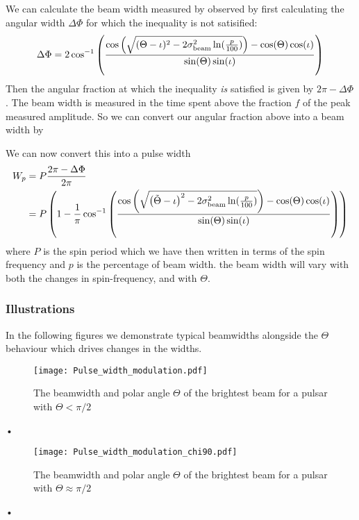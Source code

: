 \documentclass[/home/greg/Thesis/main/main.tex]{subfiles}
\begin{document}
We can calculate the beam width measured by observed by first calculating the
angular width $\Delta\Phi$ for which the inequality is not satisified:
\begin{equation}
    \Delta\Phi = 2\cos^{-1}\left(
                \frac{\cos\left(\sqrt{
                    (\Theta - \iota)^{2}-2\sigma_{\textrm{beam}}^{2} \ln(\frac{p}{100})}\right)-\cos(\Theta)\cos(\iota)}
                          {\sin(\Theta)\sin(\iota)}
                      \right)
\end{equation}
Then the angular fraction at which the inequality \emph{is} satisfied is given by
$2\pi - \Delta\Phi$. The beam width is measured in the time spent above the
fraction $f$ of the peak measured amplitude. So we can convert our angular
fraction above into a beam width by

We can now convert this into a pulse width
\begin{align}
    W_p & = P \frac{2\pi - \Delta\Phi}{2\pi} \\
          & = P\left(1 -
               \frac{1}{\pi}\cos^{-1}\left(
                   \frac{\cos\left(\sqrt{\left(\tilde{\Theta} - \iota\right)^{2}-2\sigma_{\textrm{beam}}^{2} \ln(\frac{p}{100})}\right)
                    - \cos(\Theta)\cos(\iota)}
                          {\sin(\Theta)\sin(\iota)}
                      \right)
                  \right)
\label{eqn: Wp}
\end{align}
where $P$ is the spin period which we have then written in terms of the spin
frequency and $p$ is the percentage of beam width.
the beam width will vary with both the changes in spin-frequency, and with
$\Theta$.

\subsubsection{Illustrations}

In the following figures we demonstrate typical beamwidths alongside the
$\Theta$ behaviour which drives changes in the widths.
\begin{figure}[ht]
\centering
\texttt{[image: Pulse\_width\_modulation.pdf]}
\caption{The beamwidth and polar angle $\Theta$ of the brightest beam for a pulsar
         with $\Theta < \pi/2$}
\label{fig: Pulse width modulation}
\end{figure}•

\begin{figure}[ht]
\centering
\texttt{[image: Pulse\_width\_modulation\_chi90.pdf]}
\caption{The beamwidth and polar angle $\Theta$ of the brightest beam for a pulsar
         with $\Theta \approx \pi/2$}
\label{fig: Pulse width modulation chi90}
\end{figure}•
\end{document}
